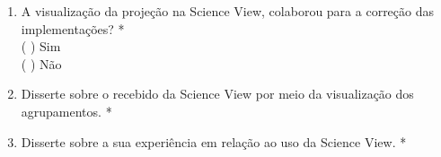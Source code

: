 \begin{enumerate}
	\item A visualização da projeção na Science View, colaborou para a correção das implementações? *\\
	(  ) Sim\\
	(  ) Não
	
	\item Disserte sobre o  recebido da Science View por meio da visualização dos agrupamentos. *
	
	\item Disserte sobre a sua experiência em relação ao uso da Science View. *
	
\end{enumerate}